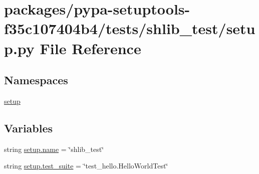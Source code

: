 \hypertarget{packages_2pypa-setuptools-f35c107404b4_2tests_2shlib__test_2setup_8py}{}\section{packages/pypa-\/setuptools-\/f35c107404b4/tests/shlib\+\_\+test/setup.py File Reference}
\label{packages_2pypa-setuptools-f35c107404b4_2tests_2shlib__test_2setup_8py}
\subsection*{Namespaces}
\begin{DoxyCompactItemize}
\item 
 \hyperlink{namespacesetup}{setup}
\end{DoxyCompactItemize}
\subsection*{Variables}
\begin{DoxyCompactItemize}
\item 
string \hyperlink{namespacesetup_a4b28e5b21e957c451ff3aa28f58c6383}{setup.\+name} = \char`\"{}shlib\+\_\+test\char`\"{}
\item 
string \hyperlink{namespacesetup_a0e55c2e28d112353d7b057e7ca1374a9}{setup.\+test\+\_\+suite} = \char`\"{}test\+\_\+hello.\+Hello\+World\+Test\char`\"{}
\end{DoxyCompactItemize}
